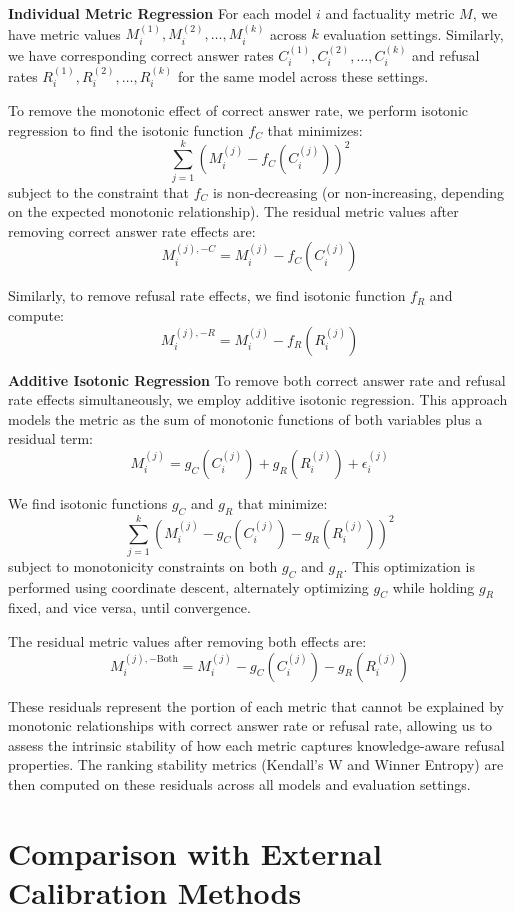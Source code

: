\noindent\textbf{Individual Metric Regression}
For each model $i$ and factuality metric $M$, we have metric values $M_i^{(1)}, M_i^{(2)}, \ldots, M_i^{(k)}$ across $k$ evaluation settings. Similarly, we have corresponding correct answer rates $C_i^{(1)}, C_i^{(2)}, \ldots, C_i^{(k)}$ and refusal rates $R_i^{(1)}, R_i^{(2)}, \ldots, R_i^{(k)}$ for the same model across these settings.

To remove the monotonic effect of correct answer rate, we perform isotonic regression to find the isotonic function $f_C$ that minimizes:
\[
\sum_{j=1}^{k} (M_i^{(j)} - f_C(C_i^{(j)}))^2
\]
subject to the constraint that $f_C$ is non-decreasing (or non-increasing, depending on the expected monotonic relationship). The residual metric values after removing correct answer rate effects are:
\[
M_i^{(j), -C} = M_i^{(j)} - f_C(C_i^{(j)})
\]

Similarly, to remove refusal rate effects, we find isotonic function $f_R$ and compute:
\[
M_i^{(j), -R} = M_i^{(j)} - f_R(R_i^{(j)})
\]

\noindent\textbf{Additive Isotonic Regression}
To remove both correct answer rate and refusal rate effects simultaneously, we employ additive isotonic regression. This approach models the metric as the sum of monotonic functions of both variables plus a residual term:
\[
M_i^{(j)} = g_C(C_i^{(j)}) + g_R(R_i^{(j)}) + \epsilon_i^{(j)}
\]

We find isotonic functions $g_C$ and $g_R$ that minimize:
\[
\sum_{j=1}^{k} (M_i^{(j)} - g_C(C_i^{(j)}) - g_R(R_i^{(j)}))^2
\]
subject to monotonicity constraints on both $g_C$ and $g_R$. This optimization is performed using coordinate descent, alternately optimizing $g_C$ while holding $g_R$ fixed, and vice versa, until convergence.

The residual metric values after removing both effects are:
\[
M_i^{(j), -\text{Both}} = M_i^{(j)} - g_C(C_i^{(j)}) - g_R(R_i^{(j)})
\]

These residuals represent the portion of each metric that cannot be explained by monotonic relationships with correct answer rate or refusal rate, allowing us to assess the intrinsic stability of how each metric captures knowledge-aware refusal properties. The ranking stability metrics (Kendall's W and Winner Entropy) are then computed on these residuals across all models and evaluation settings.


\section{Comparison with External Calibration Methods}
\label{app:external-calibration}

